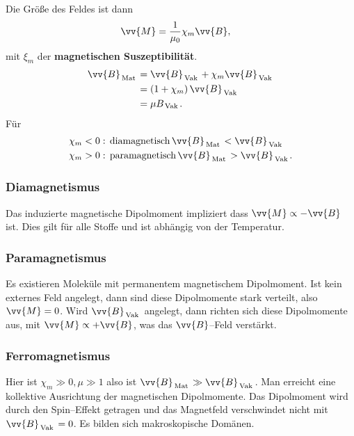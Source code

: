 \documentclass[a4paper,12pt]{article}
\begin{document}
Die Größe des Feldes ist dann
\begin{align*} 
        \vv{M}&=\dfrac{1}{\mu _0}\chi_m\vv{B}
,\end{align*} 
mit $\xi _m$ der \textbf{magnetischen Suszeptibilität}.
\begin{align*} 
        \vv{B}_{\,\text{Mat}\,}&=\vv{B}_{\,\text{Vak}\,}+\chi_m\vv{B}_{\,\text{Vak}\,}\\
                               &=\left(1+\chi_m\right)\vv{B}_{\,\text{Vak}\,}\\
                               &=\mu B_{\,\text{Vak}\,}
.\end{align*} 
Für 
\begin{align*} 
        \chi _m<0&:\,\text{diamagnetisch}\,\vv{B}_{\,\text{Mat}\,}<\vv{B}_{\,\text{Vak}\,}\\
        \chi_m>0&:\,\text{paramagnetisch}\,\vv{B}_{\,\text{Mat}\,}>\vv{B}_{\,\text{Vak}\,}
.\end{align*} 

\subsubsection{Diamagnetismus}
Das \glqq induzierte\grqq{} magnetische Dipolmoment impliziert dass $\vv{M}\propto -\vv{B}$ ist. Dies gilt für alle Stoffe und ist abhängig von der Temperatur.

\subsubsection{Paramagnetismus}
Es existieren Moleküle mit permanentem magnetischem Dipolmoment. Ist kein externes Feld angelegt, dann sind diese Dipolmomente stark verteilt, also $\vv{M}=0$. Wird $\vv{B}_{\,\text{Vak}\,}$ angelegt, dann richten sich diese Dipolmomente aus, mit $\vv{M}\propto+\vv{B}$, was das $\vv{B}$--Feld verstärkt.

\subsubsection{Ferromagnetismus}
Hier ist $\chi_m\gg 0, \mu \gg 1$ also ist $\vv{B}_{\,\text{Mat}\,}\gg \vv{B}_{\,\text{Vak}\,}$. Man erreicht eine kollektive Ausrichtung der magnetischen Dipolmomente. Das Dipolmoment wird durch den Spin--Effekt getragen und das Magnetfeld verschwindet nicht mit $\vv{B}_{\,\text{Vak}\,}=0$. Es bilden sich makroskopische Domänen.

\newpage
\end{document}

